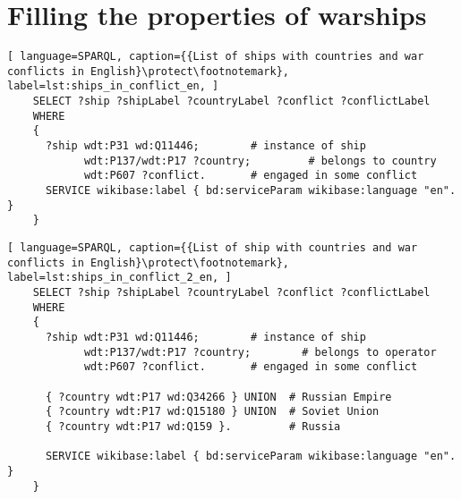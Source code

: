     
\section{Filling the properties of warships}
\begin{lstlisting}[ language=SPARQL, caption={{List of ships with countries and war conflicts in English}\protect\footnotemark}, label=lst:ships_in_conflict_en, ]
    SELECT ?ship ?shipLabel ?countryLabel ?conflict ?conflictLabel
    WHERE
    {
      ?ship wdt:P31 wd:Q11446;        # instance of ship
            wdt:P137/wdt:P17 ?country;         # belongs to country
            wdt:P607 ?conflict.       # engaged in some conflict
      SERVICE wikibase:label { bd:serviceParam wikibase:language "en". }
    }
  \end{lstlisting}

  \begin{lstlisting}[ language=SPARQL, caption={{List of ship with countries and war conflicts in English}\protect\footnotemark}, label=lst:ships_in_conflict_2_en, ]
    SELECT ?ship ?shipLabel ?countryLabel ?conflict ?conflictLabel
    WHERE
    {
      ?ship wdt:P31 wd:Q11446;        # instance of ship
            wdt:P137/wdt:P17 ?country;        # belongs to operator
            wdt:P607 ?conflict.       # engaged in some conflict
      
      { ?country wdt:P17 wd:Q34266 } UNION  # Russian Empire
      { ?country wdt:P17 wd:Q15180 } UNION  # Soviet Union
      { ?country wdt:P17 wd:Q159 }.         # Russia
      
      SERVICE wikibase:label { bd:serviceParam wikibase:language "en". }
    }
  \end{lstlisting}
